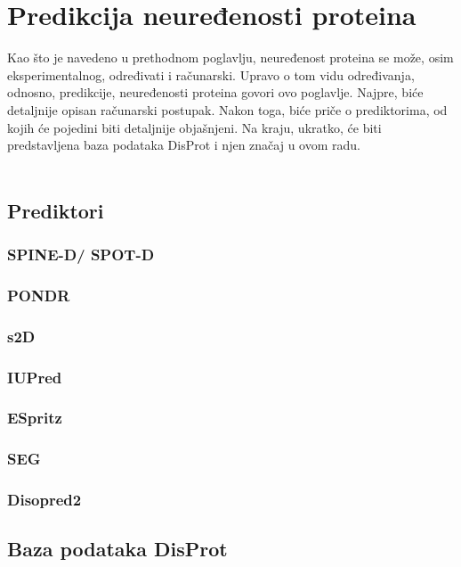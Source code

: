 
\chapter{Predikcija neuređenosti proteina} %
\label{predikcija} %

Kao što je navedeno u prethodnom poglavlju, neuređenost proteina se može, osim eksperimentalnog, određivati i računarski. Upravo o tom vidu određivanja, odnosno, predikcije, neuređenosti proteina govori ovo poglavlje. Najpre, biće detaljnije opisan računarski postupak. Nakon toga, biće priče o prediktorima, od kojih će pojedini biti detaljnije objašnjeni. Na kraju, ukratko, će biti predstavljena baza podataka DisProt i njen značaj u ovom radu.\\\\




\section{Prediktori}

\subsection{SPINE-D/ SPOT-D}



\subsection{PONDR}

\subsection{s2D}
\subsection{IUPred}
\subsection{ESpritz}
\subsection{SEG}
\subsection{Disopred2}


\section{Baza podataka DisProt}

